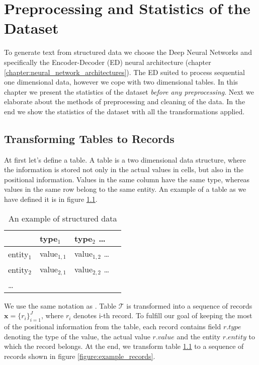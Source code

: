 \chapter{Preprocessing and Statistics of the Dataset} \label{chapter:preprocessing_and_statistics_of_the_dataset}

To generate text from structured data we choose the Deep Neural Networks and specifically the Encoder-Decoder (ED) neural architecture (chapter \ref{chapter:neural_network_architectures}). The ED suited to process sequential one dimensional data, however we cope with two dimensional tables. In this chapter we present the statistics of the dataset \emph{before any preprocessing}. Next we elaborate about the methods of preprocessing and cleaning of the data. In the end we show the statistics of the dataset with all the transformations applied.

\section{Transforming Tables to Records} \label{section:transforming_tables_to_records}

At first let's define a table. A table is a two dimensional data structure, where the information is stored not only in the actual values in cells, but also in the positional information. Values in the same column have the same type, whereas values in the same row belong to the same entity. An example of a table as we have defined it is in figure \ref{table:example_table_definition}.

\begin{table}[h]
    \centering
    \begin{tabular}{llll}
        \toprule
        {} & type$_1$ & type$_2$ \dots \\
        \midrule
        entity$_1$ & value$_{1,1}$ &  value$_{1,2}$ \dots \\
        entity$_2$ & value$_{2,1}$ & value$_{2,2}$ \dots \\
        \dots &&
    \end{tabular}
    \caption{An example of structured data} \label{table:example_table_definition}
\end{table}

We use the same notation as \citet{liang-etal-2009-learning}. Table $\mathcal{T}$ is transformed into a sequence of records $ \mathbf{x} = \{ r_i \}_{i=1}^{J} $, where $r_i$ denotes i-th record. To fulfill our goal of keeping the most of the positional information from the table, each record contains field $r.type$ denoting the type of the value, the actual value $r.value$ and the entity $r.entity$ to which the record belongs. At the end, we transform table \ref{table:example_table_definition} to a sequence of records shown in figure \ref{figure:example_records}.

